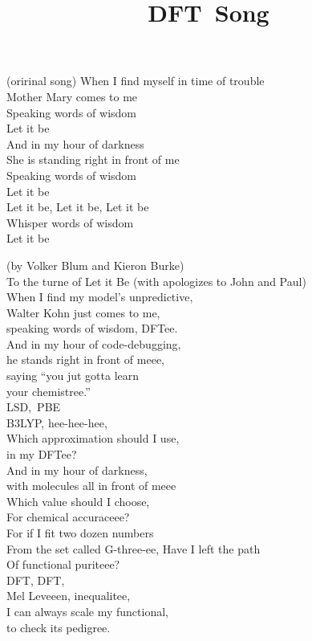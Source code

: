 \title{\rm{DFT~Song}}

(oririnal song)
When I find myself in time of trouble\\
Mother Mary comes to me\\
Speaking words of wisdom\\
Let it be\\

And in my hour of darkness\\
She is standing right in front of me\\
Speaking words of wisdom\\
Let it be\\

Let it be, Let it be, Let it be\\
Whisper words of wisdom\\
Let it be

(by Volker Blum and Kieron Burke)\\
To the turne of Let it Be (with apologizes to John and Paul)\\
When I find my model's unpredictive,\\
Walter Kohn just comes to me,\\
speaking words of wisdom,
DFTee.\\
And in my hour of code-debugging,\\
he stands right in front of meee,\\
saying ``you jut gotta learn\\
your chemistree.''\\
LSD,~PBE\\
B3LYP, hee-hee-hee,\\
Which approximation should I use,\\
in my DFTee?\\

And in my hour of darkness,\\
with molecules all in front of meee\\
Which value should I choose,\\
For chemical accuraceee?\\
For if I fit two dozen numbers\\
From the set called G-three-ee,
Have I left the path\\
Of functional puriteee?\\

DFT, DFT,\\
Mel Leveeen, inequalitee,\\
I can always scale my functional,\\
to check its pedigree.\\

